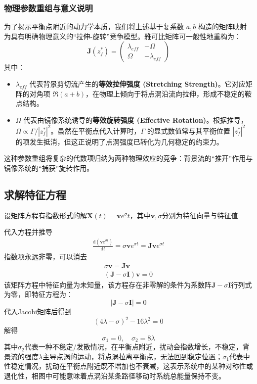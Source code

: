 \subsubsection*{物理参数重组与意义说明}
为了揭示平衡点附近的动力学本质，我们将上述基于复系数 $a, b$ 构造的矩阵映射为具有明确物理意义的“拉伸-旋转”竞争模型。雅可比矩阵可一般性地重构为：
\[
\mathbf{J}(z_f^*) = \begin{pmatrix} \lambda_{eff} & -\Omega \\ \Omega & -\lambda_{eff} \end{pmatrix}
\]
其中：
\begin{itemize}
    \item \textbf{$\lambda_{eff}$} 代表背景剪切流产生的\textbf{等效拉伸强度 (Stretching Strength)}。它对应矩阵的对角项 $\Re(a+b)$，在物理上倾向于将点涡沿流向拉伸，形成不稳定的鞍点结构。
    \item \textbf{$\Omega$} 代表由镜像系统诱导的\textbf{等效旋转强度 (Effective Rotation)}。根据推导，$ \Omega \propto \Gamma/|z_f^*|^2 $。虽然在平衡点代入计算时，$\Gamma$ 的显式数值常与其平衡位置 $|z_f^*|^2$ 的项发生抵消，但这正说明了点涡强度已转化为几何稳定的约束力。
\end{itemize}
这种参数重组将复杂的代数项归纳为两种物理效应的竞争：背景流的“推开”作用与镜像系统的“捕获”旋转作用。

\subsection{求解特征方程}
设矩阵方程有指数形式的解$\mathbf{X}(t)=\mathbf{v}e^{\sigma}t$，其中$\mathbf{v},\sigma$分别为特征向量与特征值

代入方程并推导
\begin{align*}
    \frac{\mathrm{d}(\mathbf{v}e^{\sigma t})}{\mathrm{d}t}=\sigma \mathbf{v}e^{\sigma t}=\mathbf{J}\mathbf{v}e^{\sigma t}
\end{align*}
指数项永远非零，可以消去
\begin{align*}
    \sigma \mathbf{v}=\mathbf{J}\mathbf{v}\\
    (\mathbf{J}-\sigma\mathbf{I})\mathbf{v}=0
\end{align*}
该矩阵方程中特征向量为未知量，该方程存在非零解的条件为系数阵$\mathbf{J}-\sigma\mathbf{I}$行列式为零，即特征方程为：
\[
\left|\mathbf{J}-\sigma\mathbf{I}\right|=0
\]
代入Jacobi矩阵后得到
\[
(4\lambda-\sigma)^{2}-16\lambda^{2}=0
\]
解得
\[
\sigma_{1}=0, \quad \sigma_{2}=8\lambda
\]
其中$\sigma_{2}$代表一种不稳定/发散情况，在平衡点附近，扰动会指数增长，不稳定，背景流的强度$\lambda$主导点涡的运动，将点涡拉离平衡点，无法回到稳定位置；$\sigma_{1}$代表中性稳定情况，扰动在平衡点附近既不增加也不衰减，这表示系统中的某种对称性或退化性，相图中可能意味着点涡沿某条路径移动时系统总能量保持不变。

